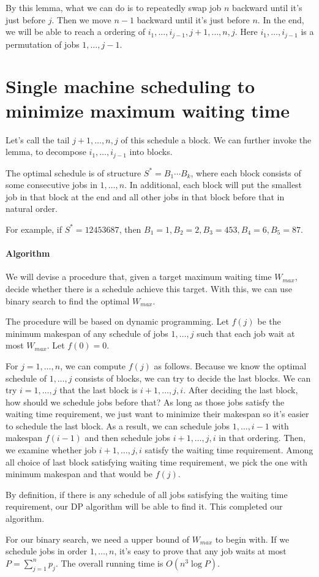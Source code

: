 By this lemma, what we can do is to repeatedly swap job $n$ backward until it's just before $j$.
Then we move $n-1$ backward until it's just before $n$.
In the end, we will be able to reach a ordering of $i_1, \ldots, i_{j-1}, j+1, \ldots, n, j$.
Here $i_1, \ldots, i_{j-1}$ is a permutation of jobs $1, \ldots, j-1$.
\section{Single machine scheduling to minimize maximum waiting time}
Let's call the tail $j+1, \ldots, n, j$ of this schedule a block. We can further invoke the lemma,
to decompose $i_1, \ldots, i_{j-1}$ into blocks.

\begin{cor}
The optimal schedule is of structure $S^* = B_1 \cdots B_k$, where each block consists of
some consecutive jobs in $1, \ldots, n$. In additional, each block will put the smallest
job in that block at the end and all other jobs in that block before that in natural order.

For example, if $S^* = 12453687$, then $B_1 = 1, B_2 = 2, B_3=453, B_4=6, B_5=87$. 
\end{cor}

\paragraph{Algorithm}
We will devise a procedure that, given a target maximum waiting time $W_{max}$, decide whether
there is a schedule achieve this target. With this, we can use binary search to find
the optimal $W_{max}$.

The procedure will be based on dynamic programming. Let $f(j)$ be the minimum makespan of
any schedule of jobs $1, \ldots, j$ such that each job wait at most $W_{max}$.
Let $f(0) = 0$.

For $j = 1,\ldots, n$, we can compute $f(j)$ as follows. Because we know the optimal schedule
of $1, \ldots, j$ consists of blocks, we can try to decide the last blocks.
We can try $i = 1, \ldots, j$ that the last block is $i+1, \ldots, j, i$. After deciding
the last block, how should we schedule jobs before that? As long as those jobs satisfy the
waiting time requirement, we just want to minimize their makespan so it's easier to
schedule the last block. As a result, we can
schedule jobs $1, \ldots, i-1$ with makespan $f(i-1)$ and then schedule jobs $i+1, \ldots, j, i$
in that ordering. Then, we examine whether job $i+1, \ldots, j, i$ satisfy the waiting time
requirement. Among all choice of last block satisfying waiting time requirement, we
pick the one with minimum makespan and that would be $f(j)$.

By definition, if there is any schedule of all jobs satisfying the waiting time requirement,
our DP algorithm will be able to find it. This completed our algorithm.

For our binary search, we need a upper bound of $W_{max}$ to begin with.
If we schedule jobs in order $1,\ldots, n$, it's easy to prove that any job waits
at most $P = \sum_{j=1}^n p_j$.
The overall running time is $O(n^3\log P)$.